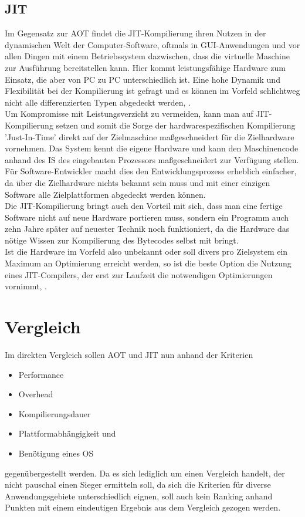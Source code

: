 \subsection{JIT}
Im Gegensatz zur \ac{AOT} findet die \ac{JIT}-Kompilierung ihren Nutzen in der dynamischen Welt der Computer-Software, oftmals in \ac{GUI}-Anwendungen und vor allen Dingen mit einem Betriebssystem dazwischen, dass die virtuelle Maschine zur Ausführung bereitstellen kann. Hier kommt leistungsfähige Hardware zum Einsatz, die aber von PC zu PC unterschiedlich ist. Eine hohe Dynamik und Flexibilität bei der Kompilierung ist gefragt und es können im Vorfeld schlichtweg nicht alle differenzierten Typen abgedeckt werden, \cite[vgl. Wade et. al 2017]{wade_kulkarni_jantz_2017}. \\
Um Kompromisse mit Leistungsverzicht zu vermeiden, kann man auf \ac{JIT}-Kompilierung setzen und somit die Sorge der hardwarespezifischen Kompilierung 'Just-In-Time' direkt auf der Zielmaschine maßgeschneidert für die Zielhardware vornehmen. Das System kennt die eigene Hardware und kann den Maschinencode anhand des \ac{IS} des eingebauten Prozessors maßgeschneidert zur Verfügung stellen. Für Software-Entwickler macht dies den Entwicklungsprozess erheblich einfacher, da über die Zielhardware nichts bekannt sein muss und mit einer einzigen Software alle Zielplattformen abgedeckt werden können. \\
Die \ac{JIT}-Kompilierung bringt auch den Vorteil mit sich, dass man eine fertige Software nicht auf neue Hardware portieren muss, sondern ein Programm auch zehn Jahre später auf neuester Technik noch funktioniert, da die Hardware das nötige Wissen zur Kompilierung des Bytecodes selbst mit bringt.\\
Ist die Hardware im Vorfeld also unbekannt oder soll divers pro Zielsystem ein Maximum an Optimierung erreicht werden, so ist die beste Option die Nutzung eines \ac{JIT}-Compilers, der erst zur Laufzeit die notwendigen Optimierungen vornimmt, \cite[vgl. Wade et. al 2017]{wade_kulkarni_jantz_2017}.

\section{Vergleich}
Im direkten Vergleich sollen \ac{AOT} und \ac{JIT} nun anhand der Kriterien
\begin{itemize} 
    \item Performance
    \item Overhead
    \item Kompilierungsdauer
    \item Plattformabhängigkeit und
    \item Benötigung eines \ac{OS}
\end{itemize}
gegenübergestellt werden. Da es sich lediglich um einen Vergleich handelt, der nicht pauschal einen Sieger ermitteln soll, da sich die Kriterien für diverse Anwendungsgebiete unterschiedlich eignen, soll auch kein Ranking anhand Punkten mit einem eindeutigen Ergebnis aus dem Vergleich gezogen werden. \\


